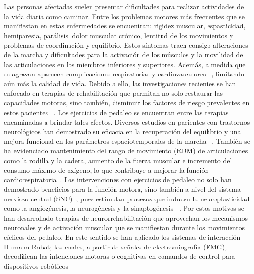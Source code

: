 \begin{introduction}
    \vspace{5pt}
    Las personas afectadas suelen presentar dificultades para realizar actividades de la vida
    diaria como caminar. Entre los problemas motores más frecuentes que se manifiestan en
    estas enfermedades se encuentran: rigidez muscular, espasticidad, hemiparesia,
    parálisis, dolor muscular crónico, lentitud de los movimientos y problemas de
    coordinación y equilibrio. Estos síntomas traen consigo alteraciones de la marcha y
    dificultades para la activación de los músculos y la movilidad de las articulaciones en los
    miembros inferiores y superiores. Además, a medida que se agravan aparecen
    complicaciones respiratorias y cardiovasculares ~\cite{barbosa2015application, miner2020therapeutic}, 
    limitando aún más la calidad de vida. Debido a ello, las investigaciones recientes se han enfocado en 
    terapias de rehabilitación que permitan no solo restaurar las capacidades motoras, sino también,
    disminuir los factores de riesgo prevalentes en estos pacientes ~\cite{barbosa2015application}. 
    Los ejercicios de pedaleo se encuentran entre las terapias encaminadas a brindar tales efectos. Diversos estudios en pacientes con trastornos neurológicos han demostrado su eficacia en la 
    recuperación del equilibrio y una mejora funcional en los parámetros espaciotemporales de la marcha
    ~\cite{quiles2020lessons, el2021effect}. También se ha evidenciado mantenimiento del rango de movimiento (RDM) de 
    articulaciones como la rodilla y la cadera, aumento de la fuerza muscular e incremento del consumo máximo 
    de oxígeno, lo que contribuye a mejorar la función cardiorespiratoria~\cite{el2021effect, ashadi2016pengaruh}. Las 
    intervenciones con ejercicios de pedaleo no solo han demostrado beneficios para la función motora, sino también a nivel del sistema nervioso
    central (SNC)~\cite{linder2019forced, alberts2011not}; pues estimulan procesos que inducen la neuroplasticidad como la angiogénesis, la neurogénesis 
    y la sinaptogénesis ~\cite{linder2019forced, el2021effect}. Por estos motivos se han desarrollado terapias de neurorrehabilitación que aprovechan 
    los mecanismos neuronales y de activación muscular que se manifiestan durante los movimientos cíclicos del pedaleo. 
    En este sentido se han aplicado los sistemas de interacción Humano-Robot; los cuales, a partir de señales de 
    electromiografía (EMG), decodifican las intenciones motoras o cognitivas en comandos de control para dispositivos robóticos.
    

\end{introduction}
